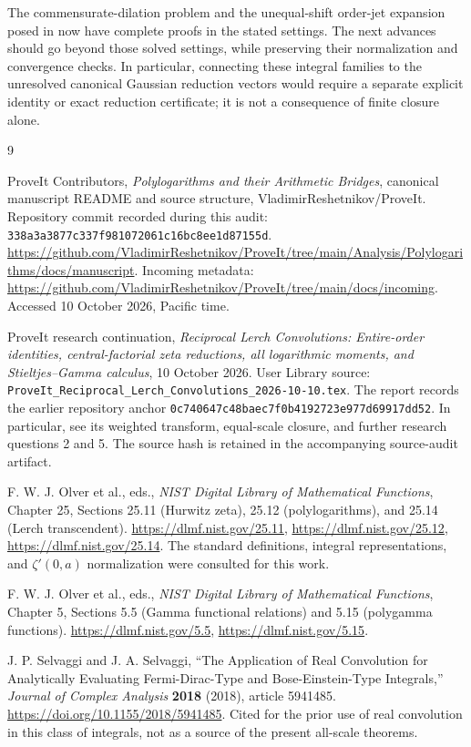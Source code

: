 \documentclass[11pt,a4paper]{article}
\numberwithin{equation}{section}
\theoremstyle{definition}\newtheorem{definition}[theorem]{Definition}
\theoremstyle{remark}\newtheorem{remark}[theorem]{Remark}
\newcommand{\src}[1]{\nolinkurl{#1}}
\begin{document}
The commensurate-dilation problem and the unequal-shift order-jet
expansion posed in \cite{RLC} now have complete proofs in the stated
settings. The next advances should go beyond those solved settings,
while preserving their normalization and convergence checks. In
particular, connecting these integral families to the unresolved
canonical Gaussian reduction vectors would require a separate explicit
identity or exact reduction certificate; it is not a consequence of
finite closure alone.

\begingroup
\raggedright
\begin{thebibliography}{9}
ProveIt Contributors,
\emph{Polylogarithms and their Arithmetic Bridges}, canonical manuscript
README and source structure, VladimirReshetnikov/ProveIt.
Repository commit recorded during this audit:
\src{338a3a3877c337f981072061c16bc8ee1d87155d}.
\url{https://github.com/VladimirReshetnikov/ProveIt/tree/main/Analysis/Polylogarithms/docs/manuscript}.
Incoming metadata:
\url{https://github.com/VladimirReshetnikov/ProveIt/tree/main/docs/incoming}.
Accessed 10 October 2026, Pacific time.

ProveIt research continuation,
\emph{Reciprocal Lerch Convolutions: Entire-order identities,
central-factorial zeta reductions, all logarithmic moments, and
Stieltjes--Gamma calculus}, 10 October 2026.
User Library source:
\src{ProveIt_Reciprocal_Lerch_Convolutions_2026-10-10.tex}.
The report records the earlier repository anchor
\src{0c740647c48baec7f0b4192723e977d69917dd52}.
In particular, see its weighted transform, equal-scale closure, and
further research questions 2 and 5. The source hash is retained in the
accompanying source-audit artifact.

F. W. J. Olver et al., eds.,
\emph{NIST Digital Library of Mathematical Functions}, Chapter 25,
Sections 25.11 (Hurwitz zeta), 25.12 (polylogarithms), and 25.14
(Lerch transcendent).
\url{https://dlmf.nist.gov/25.11},
\url{https://dlmf.nist.gov/25.12},
\url{https://dlmf.nist.gov/25.14}.
The standard definitions, integral representations, and
$\zeta'(0,a)$ normalization were consulted for this work.

F. W. J. Olver et al., eds.,
\emph{NIST Digital Library of Mathematical Functions}, Chapter 5,
Sections 5.5 (Gamma functional relations) and 5.15 (polygamma functions).
\url{https://dlmf.nist.gov/5.5},
\url{https://dlmf.nist.gov/5.15}.

J. P. Selvaggi and J. A. Selvaggi,
``The Application of Real Convolution for Analytically Evaluating
Fermi-Dirac-Type and Bose-Einstein-Type Integrals,''
\emph{Journal of Complex Analysis} \textbf{2018} (2018), article 5941485.
\url{https://doi.org/10.1155/2018/5941485}.
Cited for the prior use of real convolution in this class of integrals,
not as a source of the present all-scale theorems.
\end{thebibliography}
\endgroup

\end{document}
